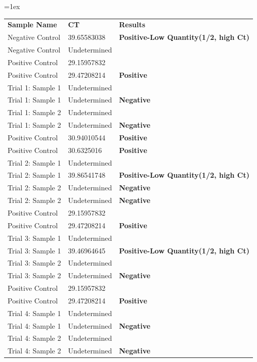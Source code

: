\documentclass[11pt, letterpaper]{article}
\begin{document}
\vskip 0.2cm
\begin{center}
\tabulinesep=1ex
\begin{tabu} to \linewidth {|X|X|X[2,l]|}
	\hline  
	\textbf{Sample Name} & \textbf{CT} & \textbf{Results}
  	\\
  	\Xhline{4\arrayrulewidth} 
  	Negative Control & 39.65583038 & \textbf{Positive-Low Quantity(1/2, high Ct)}
  	\\
  	\hline 
  	Negative Control & Undetermined &
  	\\ 
	\hline 
  	Positive Control & 29.15957832 &
  	\\ 
  	\hline 
  	Positive Control & 29.47208214 & \textbf{Positive}
  	\\ 
	\hline 
  	Trial 1: Sample 1 & Undetermined & \textbf{}
  	\\ 
	\hline 
  	Trial 1: Sample 1 & Undetermined & \textbf{Negative}
  	\\ \hline 
  	Trial 1: Sample 2 & Undetermined & \textbf{}
  	\\ \hline 
  	Trial 1: Sample 2 & Undetermined & \textbf{Negative}
  	\\ 
  	\Xhline{4\arrayrulewidth} 
  	Positive Control & 30.94010544 & \textbf{Positive}
  	\\ 
  	\hline 
  	Positive Control & 30.6325016 & \textbf{Positive}
  	\\ 
	\hline 
  	Trial 2: Sample 1 & Undetermined & \textbf{}
  	\\ 
	\hline 
  	Trial 2: Sample 1 & 39.86541748 & \textbf{Positive-Low Quantity(1/2, high Ct)}
  	\\ 
  	\hline 
  	Trial 2: Sample 2 & Undetermined & \textbf{Negative}
  	\\ 
  	\hline 
  	Trial 2: Sample 2 & Undetermined & \textbf{Negative}
  	\\ 
  	\Xhline{4\arrayrulewidth}
  	Positive Control & 29.15957832 &
  	\\ 
  	\hline 
  	Positive Control & 29.47208214 & \textbf{Positive}
  	\\ 
	\hline 
  	Trial 3: Sample 1 & Undetermined & \textbf{}
  	\\ 
	\hline 
  	Trial 3: Sample 1 & 39.46964645 & \textbf{Positive-Low Quantity(1/2, high Ct)}
  	\\ 
  	\hline 
  	Trial 3: Sample 2 & Undetermined & \textbf{}
  	\\ 
  	\hline 
  	Trial 3: Sample 2 & Undetermined & \textbf{Negative}
  	\\ 
  	\Xhline{4\arrayrulewidth}
  	Positive Control & 29.15957832 &
  	\\ 
  	\hline 
  	Positive Control & 29.47208214 & \textbf{Positive}
  	\\ 
	\hline 
  	Trial 4: Sample 1 & Undetermined & \textbf{}
  	\\ 
	\hline 
  	Trial 4: Sample 1 & Undetermined & \textbf{Negative}
  	\\ 
  	\hline 
  	Trial 4: Sample 2 & Undetermined & \textbf{}
  	\\ 
  	\hline 
  	Trial 4: Sample 2 & Undetermined & \textbf{Negative}
  	\\ 
	\hline
\end{tabu}
\end{center}
\end{document}
